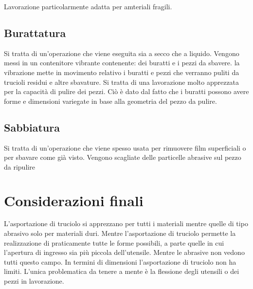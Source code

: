 
Lavorazione particolarmente adatta per amteriali fragili.

\subsection{Burattatura}
Si tratta di un'operazione che viene eseguita sia a secco che a liquido.
Vengono messi in un contenitore vibrante contenente: dei buratti e i pezzi da sbavere. la vibrazione mette in movimento relativo i buratti e pezzi che verranno puliti da trucioli residui e altre sbavature.
Si tratta di una lavorazione molto apprezzata per la capacità di pulire dei pezzi. Ciò è dato dal fatto che i buratti possono avere forme e dimensioni variegate in base alla geometria del pezzo da pulire.

\subsection{Sabbiatura}
Si tratta di un'operazione che viene spesso usata per rimuovere film superficiali o per sbavare come già visto.
Vengono scagliate delle particelle abrasive sul pezzo da ripulire

\section{Considerazioni finali}
L'asportazione di truciolo si apprezzano per tutti i materiali mentre quelle di tipo abrasivo solo per materiali duri.
Mentre l'asportazione di truciolo permette la realizzazione di praticamente tutte le forme possibili, a parte quelle in cui l'apertura di ingresso sia più piccola dell'utensile. Mentre le abrasive non vedono tutti questo campo.
In termini di dimensioni l'asportazione di truciolo non ha limiti. L'unica problematica da tenere a mente è la flessione degli utensili o dei pezzi in lavorazione.

